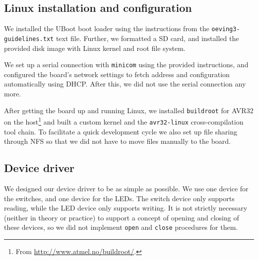 \documentclass[a4paper,10pt]{article}
\newcommand{\isrc}[1]{\texttt{#1}}
\begin{document}
\subsection{Linux installation and configuration}
We installed the UBoot boot loader using the instructions from the
\texttt{oeving3-}\\
\texttt{guidelines.txt} text file. Further, we formatted a SD card,
and installed the provided disk image with Linux kernel and root file system. 

We set up a serial connection with \texttt{minicom} using the provided
instructions, and configured the board's network settings to fetch address and
configuration automatically using DHCP. After this, we did not use the serial
connection any more.

After getting the board up and running Linux, we installed \texttt{buildroot}
for AVR32 on the host\footnote{From \url{http://www.atmel.no/buildroot/}.} and
built a custom kernel and the \texttt{avr32-linux} cross-compilation tool
chain.
To facilitate a quick development cycle we also set up file sharing through
NFS so that we did not have to move files manually to the board.

\subsection{Device driver}
We designed our device driver to be as simple as possible.  We use one device
for the switches, and one device for the LEDs. The switch device only supports
reading, while the LED device only supports writing. It is not strictly
necessary (neither in theory or practice) to support a concept of opening and
closing of these devices, so we did not implement \isrc{open} and \isrc{close}
procedures for them. 
\end{document}
